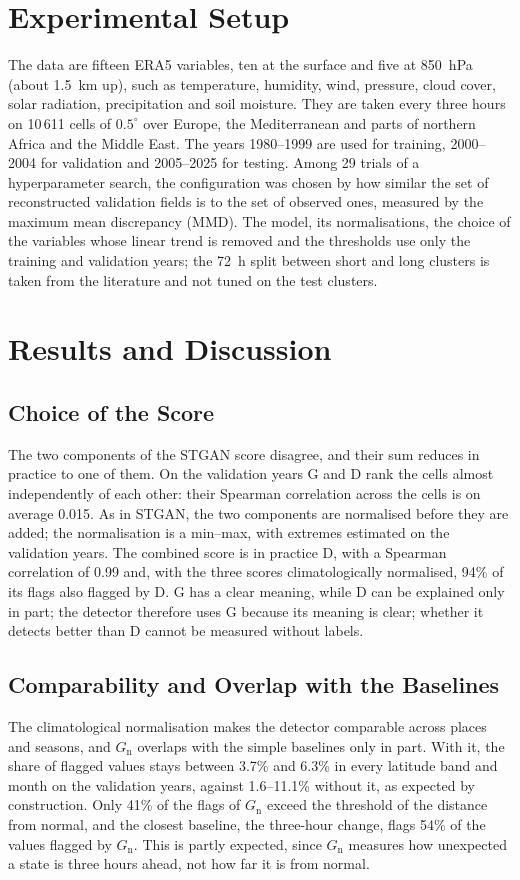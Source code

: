 \documentclass[11pt,a4paper]{article}
\newcommand{\Gn}{$G_{\mathrm{n}}$}
\begin{document}
\section{Experimental Setup}

The data are fifteen ERA5 variables, ten at the surface and five at 850~hPa (about 1.5~km up), such as temperature, humidity, wind, pressure, cloud cover, solar radiation, precipitation and soil moisture. They are taken every three hours on 10\,611 cells of $0.5^\circ$ over Europe, the Mediterranean and parts of northern Africa and the Middle East. The years 1980--1999 are used for training, 2000--2004 for validation and 2005--2025 for testing. Among 29 trials of a hyperparameter search, the configuration was chosen by how similar the set of reconstructed validation fields is to the set of observed ones, measured by the maximum mean discrepancy (MMD). The model, its normalisations, the choice of the variables whose linear trend is removed and the thresholds use only the training and validation years; the 72~h split between short and long clusters is taken from the literature and not tuned on the test clusters.

\section{Results and Discussion}

\subsection{Choice of the Score}
The two components of the STGAN score disagree, and their sum reduces in practice to one of them. On the validation years G and D rank the cells almost independently of each other: their Spearman correlation across the cells is on average 0.015. As in STGAN, the two components are normalised before they are added; the normalisation is a min--max, with extremes estimated on the validation years. The combined score is in practice D, with a Spearman correlation of 0.99 and, with the three scores climatologically normalised, 94\% of its flags also flagged by D. G has a clear meaning, while D can be explained only in part; the detector therefore uses G because its meaning is clear; whether it detects better than D cannot be measured without labels.

\subsection{Comparability and Overlap with the Baselines}
The climatological normalisation makes the detector comparable across places and seasons, and \Gn{} overlaps with the simple baselines only in part. With it, the share of flagged values stays between 3.7\% and 6.3\% in every latitude band and month on the validation years, against 1.6--11.1\% without it, as expected by construction. Only 41\% of the flags of \Gn{} exceed the threshold of the distance from normal, and the closest baseline, the three-hour change, flags 54\% of the values flagged by \Gn. This is partly expected, since \Gn{} measures how unexpected a state is three hours ahead, not how far it is from normal.
\end{document}
